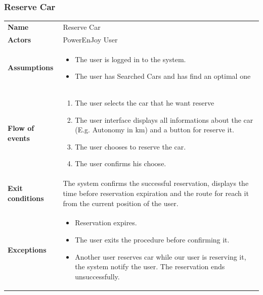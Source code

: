 \documentclass[english]{article}
\begin{document}
	\subsubsection{Reserve Car}
	\begin{center}
	\begin{tabular}{l||p{10cm}}
	\textbf{Name} 
		& Reserve Car\\ [8px]
	\textbf{Actors} 
		& PowerEnJoy User\\ [8px]
	\textbf{Assumptions} 
		& \begin{itemize}
			\item The user is logged in to the system.
			\item The user has Searched Cars and has find an optimal one
		\end{itemize}\\
	\textbf{Flow of events}
		& \begin{enumerate}
 			\item The user selects the car that he want reserve
 			\item The user interface displays all informations about the car (E.g. Autonomy in km) and a button for reserve it. 
			\item The user chooses to reserve the car. 
			\item The user confirms his choose.
		\end{enumerate}\\ 
	\textbf{Exit conditions}
		&The system confirms the successful reservation, displays the time before reservation expiration and the route for reach it from the current position of the user.\\ [8px]
	\textbf{Exceptions}
		& \begin{itemize}
			\item Reservation expires.
			\item The user exits the procedure before confirming it.
			\item Another user reserves car while our user is reserving it, the system notify the user. The reservation ends unsuccessfully.
		\end{itemize}
	\end{tabular}
	\end{center}
\end{document}
